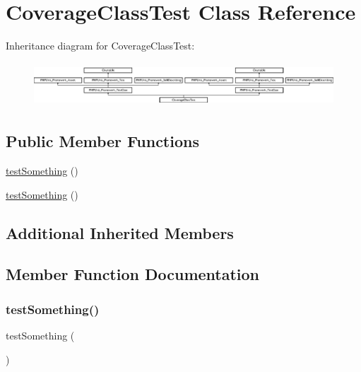 \hypertarget{class_coverage_class_test}{}\section{Coverage\+Class\+Test Class Reference}
\label{class_coverage_class_test}
Inheritance diagram for Coverage\+Class\+Test\+:\begin{figure}[H]
\begin{center}
\leavevmode
\includegraphics[height=1.651917cm]{class_coverage_class_test}
\end{center}
\end{figure}
\subsection*{Public Member Functions}
\begin{DoxyCompactItemize}
\item 
\mbox{\hyperlink{class_coverage_class_test_a0fc4e17369bc9607ebdd850d9eda8167}{test\+Something}} ()
\item 
\mbox{\hyperlink{class_coverage_class_test_a0fc4e17369bc9607ebdd850d9eda8167}{test\+Something}} ()
\end{DoxyCompactItemize}
\subsection*{Additional Inherited Members}


\subsection{Member Function Documentation}
\mbox{\label{class_coverage_class_test_a0fc4e17369bc9607ebdd850d9eda8167}} 
\subsubsection{\texorpdfstring{test\+Something()}{testSomething()}\hspace{0.1cm}{\footnotesize\ttfamily [1/2]}}
{\footnotesize\ttfamily test\+Something (\begin{DoxyParamCaption}{ }\end{DoxyParamCaption})}


